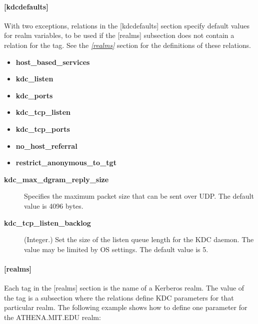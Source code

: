 \documentclass[letterpaper,10pt,english]{sphinxmanual}
\begin{document}
\paragraph{{[}kdcdefaults{]}}
\label{admin/conf_files/kdc_conf:kdcdefaults}\label{admin/conf_files/kdc_conf:id1}
With two exceptions, relations in the {[}kdcdefaults{]} section specify
default values for realm variables, to be used if the {[}realms{]}
subsection does not contain a relation for the tag.  See the
{\hyperref[admin/conf_files/kdc_conf:kdc-realms]{\emph{{[}realms{]}}}} section for the definitions of these relations.
\begin{itemize}
\item {} 
\textbf{host\_based\_services}

\item {} 
\textbf{kdc\_listen}

\item {} 
\textbf{kdc\_ports}

\item {} 
\textbf{kdc\_tcp\_listen}

\item {} 
\textbf{kdc\_tcp\_ports}

\item {} 
\textbf{no\_host\_referral}

\item {} 
\textbf{restrict\_anonymous\_to\_tgt}

\end{itemize}
\begin{description}
\item[{\textbf{kdc\_max\_dgram\_reply\_size}}] \leavevmode
Specifies the maximum packet size that can be sent over UDP.  The
default value is 4096 bytes.

\item[{\textbf{kdc\_tcp\_listen\_backlog}}] \leavevmode
(Integer.)  Set the size of the listen queue length for the KDC
daemon.  The value may be limited by OS settings.  The default
value is 5.

\end{description}


\paragraph{{[}realms{]}}
\label{admin/conf_files/kdc_conf:realms}\label{admin/conf_files/kdc_conf:kdc-realms}
Each tag in the {[}realms{]} section is the name of a Kerberos realm.  The
value of the tag is a subsection where the relations define KDC
parameters for that particular realm.  The following example shows how
to define one parameter for the ATHENA.MIT.EDU realm:
\end{document}
